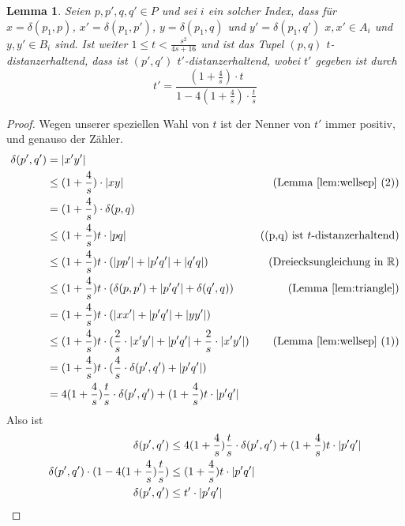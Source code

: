 \documentclass[11pt]{article}
\newcommand{\R}{\mathbb{R}}
\newtheorem{lemma}[theorem]{Lemma}
\begin{document}
    \begin{lemma}
    	\label{lem:stranget}
    	Seien $p, p', q, q' \in P$ und sei $i$ ein solcher Index, dass für $x = \delta(p_1, p)$, $x' = \delta(p_1, p')$, $y = \delta(p_1, q)$ und $y' = \delta(p_1, q')$ $x, x' \in A_i$ und $y, y' \in B_i$ sind. Ist weiter $1 \leq t < \frac{s^2}{4s + 16}$ und ist das Tupel $(p, q)$ $t$-distanzerhaltend, dass ist $(p', q')$ $t'$-distanzerhaltend, wobei $t'$ gegeben ist durch 
    	\[t' = \frac{(1+\frac{4}{s})\cdot t}{1 - 4(1 + \frac{4}{s})\cdot\frac{t}{s}}\]
    \end{lemma}
    \begin{proof}
    	Wegen unserer speziellen Wahl von $t$ ist der Nenner von $t'$ immer positiv, und genauso der Zähler.
    	\begin{align*}
	    	\delta(p', q') &= |x'y'| 
	    	\\ &\leq (1 + \frac{4}{s})\cdot|xy| & \text{(Lemma \ref{lem:wellsep} (2))}
	    	\\ &= (1 + \frac{4}{s})\cdot\delta(p, q)
	    	\\ &\leq (1 + \frac{4}{s})t\cdot |pq| & \text{((p,q) ist $t$-distanzerhaltend)}
	    	\\ &\leq (1 + \frac{4}{s})t\cdot (|pp'| + |p'q'| + |q'q|) & \text{(Dreiecksungleichung in $\R$)}
	    	\\ &\leq (1 + \frac{4}{s})t\cdot (\delta(p,p') + |p'q'| + \delta(q', q)) & \text{(Lemma \ref{lem:triangle})}
	    	\\ &= (1 + \frac{4}{s})t\cdot (|xx'| + |p'q'| + |yy'|)
	    	\\ &\leq (1 + \frac{4}{s})t\cdot (\frac{2}{s}\cdot|x'y'| + |p'q'| + \frac{2}{s}\cdot|x'y'|) & \text{(Lemma \ref{lem:wellsep} (1))}
	    	\\ &= (1 + \frac{4}{s})t\cdot (\frac{4}{s}\cdot\delta(p',q') + |p'q'|)
	    	\\ &= 4(1 + \frac{4}{s})\frac{t}{s}\cdot \delta(p',q') + (1 + \frac{4}{s})t\cdot|p'q'|
    	\end{align*}
    	Also ist
    	\begin{align*}
	    	\delta(p', q') &\leq 4(1 + \frac{4}{s})\frac{t}{s}\cdot \delta(p',q') + (1 + \frac{4}{s})t\cdot|p'q'|
	    	\\ \delta(p', q') \cdot (1 - 4(1 + \frac{4}{s})\frac{t}{s}) &\leq (1 + \frac{4}{s})t\cdot|p'q'| \tag*{\llap{\makebox[\linewidth][l]{$\Leftrightarrow$}}}
	    	\\ \delta(p',q') &\leq t' \cdot |p'q'| \tag*{\llap{\makebox[\linewidth][l]{$\Leftrightarrow$}}}
    	\end{align*}
    \end{proof}
    
\end{document}
